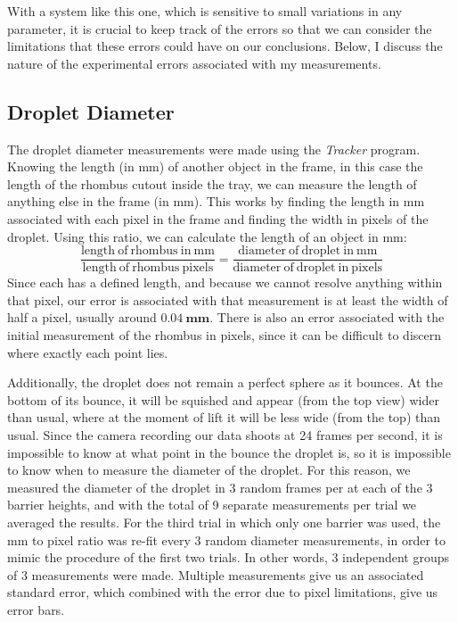     With a system like this one, which is sensitive to small variations in any parameter, it is crucial to keep track of the errors so that we can consider the limitations that these errors could have on our conclusions. Below, I discuss the nature of the experimental errors associated with my measurements.
       
    \subsection{Droplet Diameter}
    The droplet diameter measurements were made using the \textit{Tracker} program. Knowing the length (in mm) of another object in the frame, in this case the length of the rhombus cutout inside the tray, we can measure the length of anything else in the frame (in mm). This works by finding the length in mm associated with each pixel in the frame and finding the width in pixels of the droplet. Using this ratio, we can calculate the length of an object in mm:   
$$ 
\frac{\mathrm{length~of~rhombus~in~mm}}{\mathrm{length~of~rhombus~pixels}}= \frac{\mathrm{diameter~of~droplet~in~mm}}{\mathrm{diameter~of~droplet~in~pixels}} 
$$ 
Since each has a defined length, and because we cannot resolve anything within that pixel, our error is associated with that measurement is at least the width of half a pixel, usually around $\mathbf{0.04~\mathrm{\textbf{mm}}}$. There is also an error associated with the initial measurement of the rhombus in pixels, since it can be difficult to discern where exactly each point lies.

Additionally, the droplet does not remain a perfect sphere as it bounces. At the bottom of its bounce, it will be squished and appear (from the top view) wider than usual, where at the moment of lift it will be less wide (from the top) than usual. Since the camera recording our data shoots at 24 frames per second, it is impossible to know at what point in the bounce the droplet is, so it is impossible to know when to measure the diameter of the droplet. For this reason, we measured the diameter of the droplet in 3 random frames per at each of the 3 barrier heights, and with the total of 9 separate measurements per trial we averaged the results. For the third trial in which only one barrier was used, the mm to pixel ratio was re-fit every 3 random diameter measurements, in order to mimic the procedure of the first two trials. In other words, 3 independent groups of 3 measurements were made. Multiple measurements give us an associated standard error, which combined with the error due to pixel limitations, give us error bars. 

